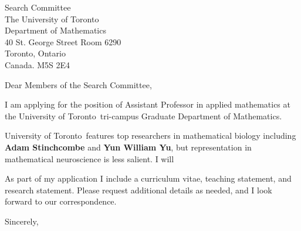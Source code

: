 \documentclass[11pt,a4paper]{letter}
\begin{document}

\def\School{University of Toronto}

\begin{letter}
{Search Committee\\
The University of Toronto\\
Department of Mathematics\\
40 St. George Street Room 6290\\
Toronto, Ontario\\
Canada. M5S 2E4}


\opening{Dear Members of the Search Committee,}

I am applying for the position of Assistant Professor in applied mathematics at the \School~tri-campus Graduate Department of Mathematics. 



\School~features top researchers in mathematical biology including \textbf{Adam Stinchcombe} and \textbf{Yun William Yu}, but representation in mathematical neuroscience is less salient. I will 



As part of my application I include a curriculum vitae, teaching statement, and research statement. Please request additional details as needed, and I look forward to our correspondence.

\closing{Sincerely,}
\end{letter}
\end{document}
